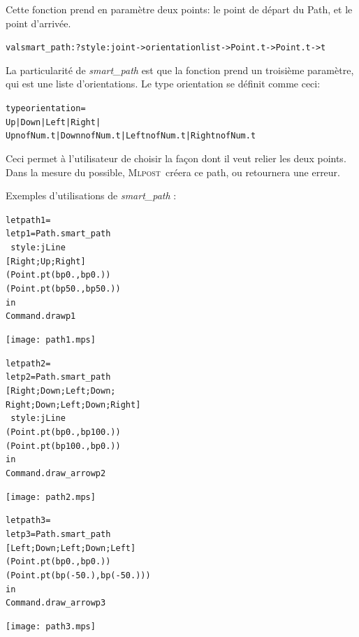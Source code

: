 \documentclass[a4paper,12pt]{article}
\newcommand{\mlpost}{\textsc{Mlpost}}
\begin{document}
Cette fonction prend en paramètre deux points: le point de départ du Path, et le point d'arrivée. 
\begin{alltt}
  val smart_path : ?style:joint -> orientation list -> Point.t -> Point.t -> t
\end{alltt}
La particularité de \textit{smart\_path} est que la fonction prend un troisième paramètre, qui est une liste d'orientations.
Le type orientation se définit comme ceci:
\begin{alltt}
  type orientation =
  Up | Down | Left | Right |
  Upn of Num.t | Downn of Num.t | Leftn of Num.t | Rightn of Num.t
\end{alltt}
Ceci permet à l'utilisateur de choisir la façon dont il veut relier les deux points. Dans la mesure du possible, \mlpost\ créera ce path, ou retournera une erreur. 

Exemples d'utilisations de \textit{smart\_path} :

\bigskip
\begin{minipage}{0.5\linewidth}
  \begin{alltt}
    let path1 = 
    let p1 = Path.smart_path 
    ~style:jLine
    [Right;Up;Right]
    (Point.pt (bp 0.,bp 0.)) 
    (Point.pt (bp 50.,bp 50.))
    in
    Command.draw p1
  \end{alltt}
\end{minipage}
\begin{minipage}{0.5\linewidth}
\begin{center}
\texttt{[image: path1.mps]}
\end{center}
\end{minipage}

\bigskip
\begin{minipage}{0.5\linewidth}
  \begin{alltt}
    let path2 = 
    let p2 = Path.smart_path 
    [Right;Down;Left;Down;
      Right;Down;Left;Down;Right]
    ~style:jLine
    (Point.pt (bp 0.,bp 100.)) 
    (Point.pt (bp 100.,bp 0.))
    in
    Command.draw_arrow p2
  \end{alltt}
\end{minipage}
\begin{minipage}{0.5\linewidth}
\begin{center}
\texttt{[image: path2.mps]}
\end{center}
\end{minipage}

\bigskip
\begin{minipage}{0.5\linewidth}
  \begin{alltt}
    let path3 = 
    let p3 = Path.smart_path 
    [Left;Down;Left;Down;Left] 
    (Point.pt (bp 0.,bp 0.)) 
    (Point.pt (bp (-50.),bp (-50.)))
    in
    Command.draw_arrow p3
  \end{alltt}
\end{minipage}
\begin{minipage}{0.5\linewidth}
\begin{center}
\texttt{[image: path3.mps]}
\end{center}
\end{minipage}
\end{document}

